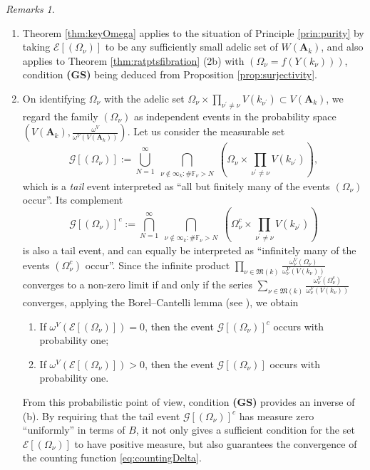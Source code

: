 \documentclass[11pt,letterpaper]{amsart}
\newcommand{\BF}{{\mathbb {F}}}
\newcommand{\CE}{{\mathcal {E}}}
\newcommand{\CG}{{\mathcal {G}}}
\newcommand{\RA}{{\mathbf {A}}}
\theoremstyle{plain}
\numberwithin{equation}{section}
\theoremstyle{definition}
\theoremstyle{remark}
\newtheorem{remarks}[theorem]{Remarks}
\begin{document}
\begin{remarks}\hfill
	\begin{enumerate}
		\item Theorem \ref{thm:keyOmega} applies to the situation of Principle \ref{prin:purity} by taking $\CE[(\Omega_{\nu})]$ to be any sufficiently small adelic set of $W(\RA_k)$, and also applies to Theorem \ref{thm:ratptsfibration} (2b) with $(\Omega_\nu=f(Y(k_\nu)))$, condition \textbf{(GS)} being deduced from Proposition \ref{prop:surjectivity}. 
		\item 	On identifying $\Omega_{\nu}$ with the adelic set $\Omega_{\nu}\times \prod_{\nu^\prime\neq \nu}V(k_{\nu^\prime})\subset V(\RA_k)$,
		we regard the family $(\Omega_{\nu})$ as independent events in the probability space $\left(V(\RA_k),\frac{\omega^V}{\omega^V(V(\RA_k))}\right)$.  Let us consider the measurable set $$\CG[(\Omega_{\nu})]:=\bigcup_{N=1}^\infty\bigcap_{\substack{\nu\notin\infty_k: \#\BF_\nu>N}}\left(\Omega_{\nu}\times \prod_{\nu^\prime\neq \nu}V(k_{\nu^\prime})\right),$$ which is a \emph{tail} event interpreted as ``all but finitely many of the events $(\Omega_{\nu})$ occur''.  Its complement  $$ \CG[(\Omega_{\nu})]^c:=\bigcap_{N=1}^\infty \bigcap_{\substack{\nu\notin\infty_k: \#\BF_\nu>N}}\left(\Omega_{\nu}^c\times \prod_{\nu^\prime\neq \nu}V(k_{\nu^\prime})\right)$$ is also a tail event, and can equally be interpreted as  ``infinitely many of the events $(\Omega_{\nu}^c)$ occur''.  Since the infinite product $\prod_{\nu\in\mathfrak{M}(k)} \frac{\omega_\nu^V(\Omega_{\nu})}{\omega_\nu^V(V(k_\nu))}$ converges to a non-zero limit if and only if the series $\sum_{\nu\in\mathfrak{M}(k)}  \frac{\omega_\nu^V(\Omega^c_{\nu})}{\omega_\nu^V(V(k_\nu))}$ converges, applying the Borel--Cantelli lemma (see \cite[10.10]{Folland}), we obtain
		\begin{enumerate}
			\item If $\omega^V\left(\CE[(\Omega_{\nu})]\right)=0$, then the event $\CG[(\Omega_{\nu})]^c$ occurs with probability one;
			\item If $\omega^V\left(\CE[(\Omega_{\nu})]\right)>0$, then  the event  $ \CG[(\Omega_{\nu})]$ occurs with probability one.
		\end{enumerate}
		From this probabilistic point of view, condition \textbf{(GS)} provides 
		an inverse of (b). By requiring that the tail event $\CG[(\Omega_{\nu})]^c$  has measure zero ``uniformly'' in terms of $B$, it not only gives a sufficient condition for the set $\CE[(\Omega_{\nu})]$ to have positive measure, but also guarantees the  convergence of the counting function \eqref{eq:countingDelta}.
	\end{enumerate}
\end{remarks}
\end{document}
